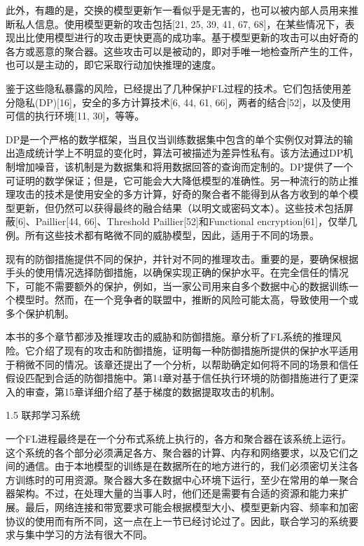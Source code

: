 此外，有趣的是，交换的模型更新乍一看似乎是无害的，也可以被内部人员用来推断私人信息。使用模型更新的攻击包括[21, 25, 39, 41, 67, 68]，在某些情况下，表现出比使用模型进行的攻击更快更高的成功率。基于模型更新的攻击可以由好奇的各方或恶意的聚合器。这些攻击可以是被动的，即对手唯一地检查所产生的工件，也可以是主动的，即它采取行动加快推理的速度。

鉴于这些隐私暴露的风险，已经提出了几种保护FL过程的技术。它们包括使用差分隐私(DP)[16]，安全的多方计算技术[6, 44, 61, 66]，两者的结合[52]，以及使用可信的执行环境[11, 30]，等等。

DP是一个严格的数学框架，当且仅当训练数据集中包含的单个实例仅对算法的输出造成统计学上不明显的变化时，算法可被描述为差异性私有。该方法通过DP机制增加噪音，该机制是为数据集和将用数据回答的查询而定制的。DP提供了一个可证明的数学保证；但是，它可能会大大降低模型的准确性。另一种流行的防止推理攻击的技术是使用安全的多方计算，好奇的聚合者不能得到从各方收到的单个模型更新，但仍然可以获得最终的融合结果（以明文或密码文本）。这些技术包括屏蔽[6]、Paillier[44, 66]、Threshold Paillier[52]和Functional encryption[61]，仅举几例。所有这些技术都有略微不同的威胁模型，因此，适用于不同的场景。

现有的防御措施提供不同的保护，并针对不同的推理攻击。重要的是，要确保根据手头的使用情况选择防御措施，以确保实现正确的保护水平。在完全信任的情况下，可能不需要额外的保护，例如，当一家公司用来自多个数据中心的数据训练一个模型时。然而，在一个竞争者的联盟中，推断的风险可能太高，导致使用一个或多个保护机制。

本书的多个章节都涉及推理攻击的威胁和防御措施。章分析了FL系统的推理风险。它介绍了现有的攻击和防御措施，证明每一种防御措施所提供的保护水平适用于稍微不同的情况。该章还提出了一个分析，以帮助确定如何将不同的场景和信任假设匹配到合适的防御措施中。第14章对基于信任执行环境的防御措施进行了更深入的审查，第15章详细介绍了基于梯度的数据提取攻击的机制。

1.5 联邦学习系统

一个FL进程最终是在一个分布式系统上执行的，各方和聚合器在该系统上运行。这个系统的各个部分必须满足各方、聚合器的计算、内存和网络要求，以及它们之间的通信。由于本地模型的训练是在数据所在的地方进行的，我们必须密切关注各方训练时的可用资源。聚合器大多在数据中心环境下运行，至少在常用的单一聚合器架构。不过，在处理大量的当事人时，他们还是需要有合适的资源和能力来扩展。最后，网络连接和带宽要求可能会根据模型大小、模型更新内容、频率和加密协议的使用而有所不同，这一点在上一节已经讨论过了。因此，联合学习的系统要求与集中学习的方法有很大不同。

